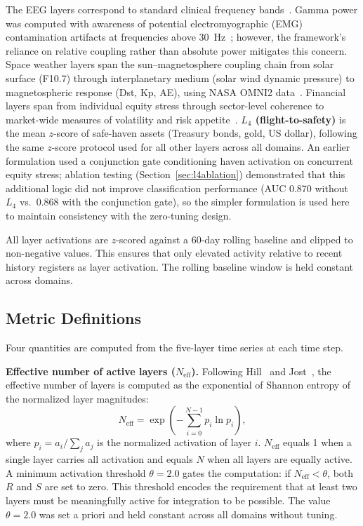 \documentclass[12pt,a4paper]{article}
\begin{document}
The EEG layers correspond to standard clinical frequency bands~\cite{berry2017,oppenheim1997}. Gamma power was computed with awareness of potential electromyographic (EMG) contamination artifacts at frequencies above 30~Hz~\cite{muthukumaraswamy2013}; however, the framework's reliance on relative coupling rather than absolute power mitigates this concern. Space weather layers span the sun--magnetosphere coupling chain from solar surface (F10.7) through interplanetary medium (solar wind dynamic pressure) to magnetospheric response (Dst, Kp, AE), using NASA OMNI2 data~\cite{papitashvili2020}. Financial layers span from individual equity stress through sector-level coherence to market-wide measures of volatility and risk appetite~\cite{forbes2002}. \textbf{$L_4$ (flight-to-safety)} is the mean $z$-score of safe-haven assets (Treasury bonds, gold, US dollar), following the same $z$-score protocol used for all other layers across all domains. An earlier formulation used a conjunction gate conditioning haven activation on concurrent equity stress; ablation testing (Section~\ref{sec:l4ablation}) demonstrated that this additional logic did not improve classification performance (AUC 0.870 without $L_4$ vs.\ 0.868 with the conjunction gate), so the simpler formulation is used here to maintain consistency with the zero-tuning design.

All layer activations are $z$-scored against a 60-day rolling baseline and clipped to non-negative values. This ensures that only elevated activity relative to recent history registers as layer activation. The rolling baseline window is held constant across domains.

\subsection{Metric Definitions}

Four quantities are computed from the five-layer time series at each time step.

\textbf{Effective number of active layers ($N_\text{eff}$).} Following Hill~\cite{hill1973} and Jost~\cite{jost2006}, the effective number of layers is computed as the exponential of Shannon entropy of the normalized layer magnitudes:
\begin{equation}
N_{\text{eff}} = \exp\left( -\sum_{i=0}^{N-1} p_i \ln p_i \right),
\end{equation}
where $p_i = a_i / \sum_j a_j$ is the normalized activation of layer $i$. $N_\text{eff}$ equals 1 when a single layer carries all activation and equals $N$ when all layers are equally active. A minimum activation threshold $\theta = 2.0$ gates the computation: if $N_\text{eff} < \theta$, both $R$ and $S$ are set to zero. This threshold encodes the requirement that at least two layers must be meaningfully active for integration to be possible. The value $\theta = 2.0$ was set a priori and held constant across all domains without tuning.
\end{document}
